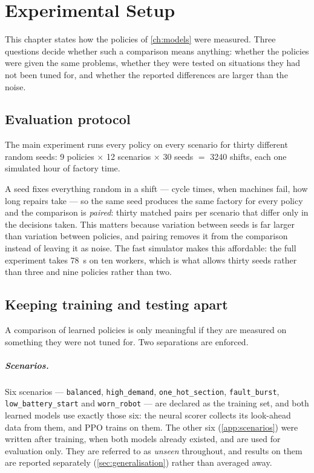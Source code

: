 \chapter{Experimental Setup}
\label{ch:setup}

This chapter states how the policies of \cref{ch:models} were measured. Three questions decide
whether such a comparison means anything: whether the policies were given the same problems,
whether they were tested on situations they had not been tuned for, and whether the reported
differences are larger than the noise.

\section{Evaluation protocol}
\label{sec:protocol}

The main experiment runs every policy on every scenario for thirty different random seeds:
\num{9} policies $\times$ \num{12} scenarios $\times$ \num{30} seeds $=$ \num{3240} shifts, each
one simulated hour of factory time.

A seed fixes everything random in a shift --- cycle times, when machines fail, how long repairs
take --- so the same seed produces the same factory for every policy and the comparison is
\emph{paired}: thirty matched pairs per scenario that differ only in the decisions taken. This
matters because variation between seeds is far larger than variation between policies, and pairing
removes it from the comparison instead of leaving it as noise. The fast simulator makes this
affordable: the full experiment takes \SI{78}{\second} on ten workers, which is what allows thirty
seeds rather than three and nine policies rather than two.

\section{Keeping training and testing apart}
\label{sec:splits}

A comparison of learned policies is only meaningful if they are measured on something they were
not tuned for. Two separations are enforced.

\paragraph{Scenarios.}
Six scenarios --- \texttt{balanced}, \texttt{high\_demand}, \texttt{one\_hot\_section},
\texttt{fault\_burst}, \texttt{low\_battery\_start} and \texttt{worn\_robot} --- are declared as
the training set, and both learned models use exactly those six: the neural scorer collects its
look-ahead data from them, and PPO trains on them. The other six (\cref{app:scenarios}) were
written after training, when both models already existed, and are used for evaluation only. They
are referred to as \emph{unseen} throughout, and results on them are reported separately
(\cref{sec:generalisation}) rather than averaged away.

